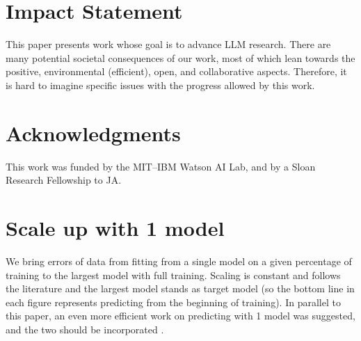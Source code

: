 \documentclass{article}
\theoremstyle{plain}
\theoremstyle{definition}
\theoremstyle{remark}
\begin{document}
\section*{Impact Statement}
This paper presents work whose goal is to advance LLM research. There are many potential societal consequences of our work, most of which lean towards the positive, environmental (efficient), open, and collaborative aspects. Therefore, it is hard to imagine specific issues with the progress allowed by this work.

\section*{Acknowledgments}

This work was funded by the MIT--IBM Watson AI Lab, and by a Sloan Research Fellowship to JA.




\appendix
\section{Scale up with 1 model}\label{ap:1m}
We bring errors of data from fitting from a single model on a given percentage of training to the largest model with full training. Scaling is constant and follows the literature \citep{datablations}
and the largest model stands as target model (so the bottom line in each figure represents predicting from the beginning of training). In parallel to this paper, an even more efficient work on predicting with 1 model was suggested, and the two should be incorporated \citep{polo2024sloth}.
\end{document}
